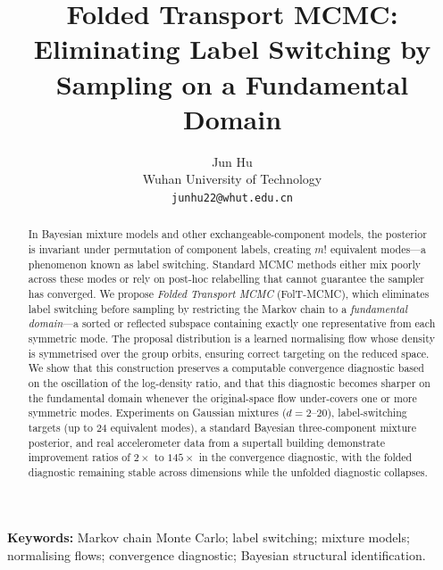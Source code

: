 \documentclass[a4paper,12pt]{article}
\title{Folded Transport MCMC: Eliminating Label Switching
  by Sampling on a Fundamental Domain}
\author{Jun Hu \\
  {\small Wuhan University of Technology} \\
  {\small \texttt{junhu22@whut.edu.cn}}}
\date{}
\theoremstyle{definition}
\theoremstyle{remark}
\begin{document}
\maketitle

\begin{abstract}
In Bayesian mixture models and other exchangeable-component
models, the posterior is invariant under permutation of
component labels, creating $m!$ equivalent modes---a
phenomenon known as label switching.  Standard MCMC methods
either mix poorly across these modes or rely on post-hoc
relabelling that cannot guarantee the sampler has converged.
We propose \emph{Folded Transport MCMC} (FolT-MCMC), which
eliminates label switching before sampling by restricting the
Markov chain to a \emph{fundamental domain}---a sorted or
reflected subspace containing exactly one representative from
each symmetric mode.  The proposal distribution is a learned
normalising flow whose density is symmetrised over the group
orbits, ensuring correct targeting on the reduced space.
We show that this construction preserves a computable
convergence diagnostic based on the oscillation of the
log-density ratio, and that this diagnostic becomes sharper on the fundamental
domain whenever the original-space flow under-covers one or
more symmetric modes.
Experiments on Gaussian mixtures ($d = 2$--$20$),
label-switching targets (up to $24$ equivalent modes), a
standard Bayesian three-component mixture posterior, and real
accelerometer data from a supertall building demonstrate
improvement ratios of $2\times$ to $145\times$ in the
convergence diagnostic, with the folded diagnostic remaining
stable across dimensions while the unfolded diagnostic
collapses.
\end{abstract}

\noindent
\textbf{Keywords:}
Markov chain Monte Carlo; label switching; mixture models;
normalising flows; convergence diagnostic;
Bayesian structural identification.

\bigskip











\end{document}
